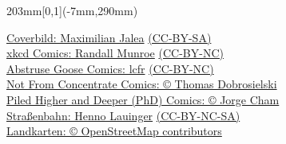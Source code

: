 {    \begin{textblock*}{203mm}[0,1](-7mm,290mm)
        \begin{flushright}
            \footnotesize
	    \href{http://mntl.de}{Coverbild: Maximilian Jalea} \href{http://creativecommons.org/licenses/by-sa/4.0/}{(CC-BY-SA)}\\ %
            \href{http://xkcd.com/}{xkcd Comics: Randall Munroe} \href{http://creativecommons.org/licenses/by-nc/2.5/}{(CC-BY-NC)}\\
            \href{http://abstrusegoose.com/}{Abstruse Goose Comics: lcfr} \href{http://creativecommons.org/licenses/by-nc/3.0/us/}{(CC-BY-NC)}\\
            \href{http://nfccomic.com/index.php}{Not From Concentrate Comics: \copyright{} Thomas Dobrosielski}\\
            \href{http://www.phdcomics.com/}{Piled Higher and Deeper (PhD) Comics: \copyright{} Jorge Cham}\\
            \href{http://mbah.deviantart.com/art/Evil-Tram-126691939}{Straßenbahn: Henno Lauinger} \href{http://creativecommons.org/licenses/by-nc-sa/3.0/}{(CC-BY-NC-SA)}\\
			\href{http://www.openstreetmap.org/}{Landkarten: \copyright{} OpenStreetMap contributors} 
        \end{flushright}
    \end{textblock*}
}

\graphicspath{{./bilder/}{./}}

\newcommand{\dschungel}{
    \marginpar{
        \centering
        \hyperref[dschungel] {
            \texttt{[image: dschungelbuch\_3.pdf]}
        }
    }
}



